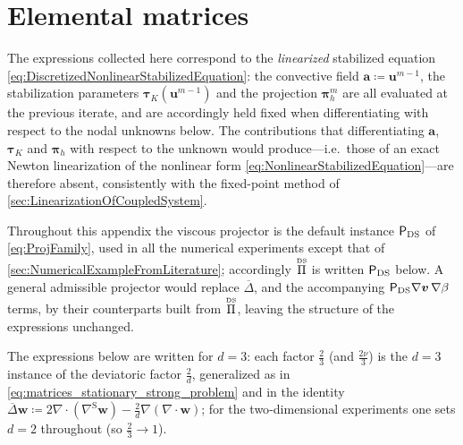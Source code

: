 
\section{Elemental matrices} \label{app:ElementalMatrices}
The expressions collected here correspond to the \emph{linearized} stabilized equation \cref{eq:DiscretizedNonlinearStabilizedEquation}: the convective field $\boldsymbol{a} \coloneqq \boldsymbol{u}^{m-1}$, the stabilization parameters $\boldsymbol{\tau}_K(\boldsymbol{u}^{m-1})$ and the projection $\boldsymbol{\pi}_h^m$ are all evaluated at the previous iterate, and are accordingly held fixed when differentiating with respect to the nodal unknowns below. The contributions that differentiating $\boldsymbol{a}$, $\boldsymbol{\tau}_K$ and $\boldsymbol{\pi}_h$ with respect to the unknown would produce---i.e.\ those of an exact Newton linearization of the nonlinear form \cref{eq:NonlinearStabilizedEquation}---are therefore absent, consistently with the fixed{\hyp}point method of \cref{sec:LinearizationOfCoupledSystem}.

Throughout this appendix the viscous projector is the default instance $\mathsf{P}_{\mathrm{DS}}$ of \cref{eq:ProjFamily}, used in all the numerical experiments except that of \cref{sec:NumericalExampleFromLiterature}; accordingly $\overset{\scriptscriptstyle{\text{DS}}}{\Pi}$ is written $\mathsf{P}_{\mathrm{DS}}$ below. A general admissible projector would replace $\overline{\Delta}$, and the accompanying $\mathsf{P}_{\mathrm{DS}}\nabla\boldsymbol{v}\,\nabla\beta$ terms, by their counterparts built from $\overset{\scriptscriptstyle{\text{DS}}}{\Pi}$, leaving the structure of the expressions unchanged.

The expressions below are written for $d=3$: each factor $\tfrac{2}{3}$ (and $\tfrac{2\nu}{3}$) is the $d=3$ instance of the deviatoric factor $\tfrac{2}{d}$, generalized as in \cref{eq:matrices_stationary_strong_problem} and in the identity $\overline{\Delta}\boldsymbol{w}\coloneqq 2\nabla\cdot(\nabla^{\mathrm S}\boldsymbol{w})-\tfrac{2}{d}\nabla(\nabla\cdot\boldsymbol{w})$; for the two{\hyp}dimensional experiments one sets $d=2$ throughout (so $\tfrac{2}{3}\to1$).

